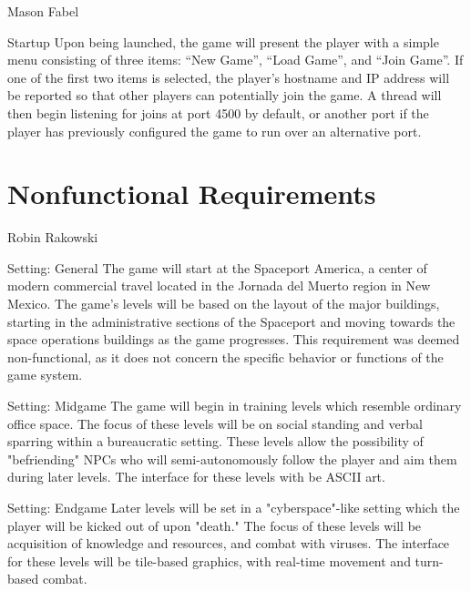 \documentclass[12pt]{report}
\begin{document}
\begin{section}{Mason Fabel}
\begin{subsection}{Startup}
Upon being launched, the game will present the player with a simple menu
consisting of three items: ``New Game'', ``Load Game'', and ``Join Game''.
If one of the first two items is selected, the player's hostname and IP
address will be reported so that other players can potentially join the
game. A thread will then begin listening for joins at port 4500 by default,
or another port if the player has previously configured the game to run
over an alternative port.
\end{subsection}
\end{section}

\chapter{Nonfunctional Requirements}


\begin{section}{Robin Rakowski}

\begin{subsection}{Setting: General}
The game will start at the Spaceport America, a center of modern commercial travel located in the Jornada del Muerto region in New Mexico. The game's levels will be based on the layout of the major buildings, starting in the administrative sections of the Spaceport and moving towards the space operations buildings as the game progresses. This requirement was deemed non-functional, as it does not concern the specific behavior or functions of the game system.
\end{subsection}

\begin{subsection}{Setting: Midgame}
The game will begin in training levels which resemble ordinary office space. The focus of these levels will be on social standing and verbal sparring within a bureaucratic setting. These levels allow the possibility of "befriending" NPCs who will semi-autonomously follow the player and aim them during later levels. The interface for these levels with be ASCII art.
\end{subsection}

\begin{subsection}{Setting: Endgame}
Later levels will be set in a "cyberspace"-like setting which the player will be kicked out of upon "death." The focus of these levels will be acquisition of knowledge and resources, and combat with viruses. The interface for these levels will be tile-based graphics, with real-time movement and turn-based combat.
\end{subsection}

\end{section}
\end{document}
